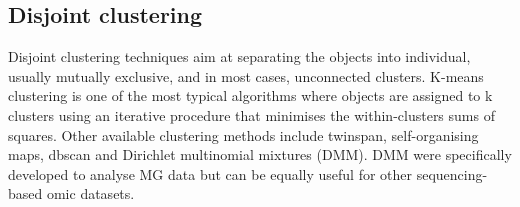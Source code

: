 \documentclass[
]{book}
\newenvironment{Shaded}{\begin{snugshade}}{\end{snugshade}}
\newcommand{\AttributeTok}[1]{\textcolor[rgb]{0.77,0.63,0.00}{#1}}
\newcommand{\CommentTok}[1]{\textcolor[rgb]{0.56,0.35,0.01}{\textit{#1}}}
\newcommand{\DecValTok}[1]{\textcolor[rgb]{0.00,0.00,0.81}{#1}}
\newcommand{\FunctionTok}[1]{\textcolor[rgb]{0.00,0.00,0.00}{#1}}
\newcommand{\NormalTok}[1]{#1}
\newcommand{\OtherTok}[1]{\textcolor[rgb]{0.56,0.35,0.01}{#1}}
\newcommand{\SpecialCharTok}[1]{\textcolor[rgb]{0.00,0.00,0.00}{#1}}
\newcommand{\StringTok}[1]{\textcolor[rgb]{0.31,0.60,0.02}{#1}}
\begin{document}
\normalsize

\hypertarget{disjoint-clustering}{%
\subsection{Disjoint clustering}\label{disjoint-clustering}}

Disjoint clustering techniques aim at separating the objects into individual, usually mutually exclusive, and in most cases, unconnected clusters. K-means clustering is one of the most typical algorithms where objects are assigned to k clusters using an iterative procedure that minimises the within-clusters sums of squares. Other available clustering methods include twinspan, self-organising maps, dbscan and Dirichlet multinomial mixtures (DMM). DMM were specifically developed to analyse MG data but can be equally useful for other sequencing-based omic datasets.

\small

\begin{Shaded}
\end{Shaded}

\normalsize

\small

\begin{Shaded}
\end{Shaded}
\end{document}
